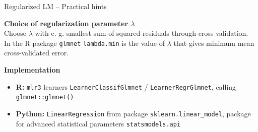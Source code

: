 \documentclass[11pt,compress,t,notes=noshow, xcolor=table]{beamer}
\newcommand{\highlight}[1]{\textcolor{highlightcol}{\textbf{#1}}}
\let\code=\texttt
\begin{document}
\begin{frame}{Regularized LM -- Practical hints}

\footnotesize

  \highlight{Choice of regularization parameter  $\lambda$} \\

 Choose $\lambda$ with e. g. smallest sum of squared residuals through cross-validation. \\
 In the R package \code{glmnet} \code{lambda.min} is the value of $\lambda$ that gives minimum mean cross-validated error.
 
\medskip

\highlight{Implementation}

\begin{itemize}
    \item \textbf{R:} \code{mlr3} learners \code{LearnerClassifGlmnet} / 
    \code{LearnerRegrGlmnet}, calling \code{glmnet::glmnet()}
    \item \textbf{Python:} \code{LinearRegression} from package 
    \code{sklearn.linear\_model}, package for advanced statistical parameters 
    \code{statsmodels.api} 
  \end{itemize}

\end{frame}

\end{document}
